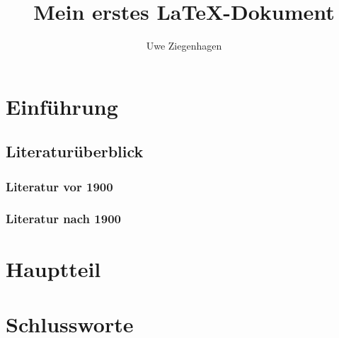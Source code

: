 \documentclass[12pt,ngerman,parskip=half]{scrartcl}
\author{Uwe Ziegenhagen}
\title{Mein erstes \LaTeX-Dokument}
\begin{document}
\maketitle

\tableofcontents

\section{Einführung}
\subsection{Literaturüberblick}
\subsubsection{Literatur vor 1900}

\blindtext

\blindtext

\blindtext

\subsubsection{Literatur nach 1900}

\blindtext

\blindtext

\blindtext

\section{Hauptteil}

\blindtext[100]


\section{Schlussworte}

\blindtext[10]
\end{document}
